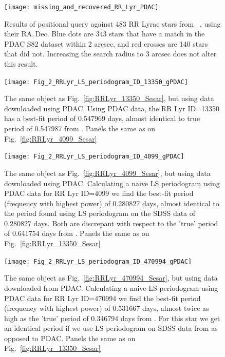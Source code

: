 \documentclass[fleqn,usenatbib]{mnras} %
\begin{document}
\begin{figure}
\texttt{[image: missing\_and\_recovered\_RR\_Lyr\_PDAC]}
\caption{Results of positional query against 483 RR Lyrae stars from ~\citep{sesar2010}, using their $\mathrm{RA}, \mathrm{Dec}$. Blue dots are 343 stars that have a match in the PDAC S82 dataset within 2 arcsec, and red crosses are 140 stars that did not. Increasing the search radius to 3 arcsec does not alter this result. }
\label{fig:PDAC_query_ra_dec}
\end{figure}


\begin{figure}
\texttt{[image: Fig\_2\_RRLyr\_LS\_periodogram\_ID\_13350\_gPDAC]}
\caption{ The same object as Fig.~\ref{fig:RRLyr_13350_Sesar}, but using data downloaded using PDAC. Using PDAC data, the RR Lyr ID=13350 has a best-fit period of 0.547969 days, almost identical to true period of  0.547987 from \citep{sesar2010}. Panels the same as on Fig.~\ref{fig:RRLyr_4099_Sesar}}
\label{fig:RRLyr_13350_PDAC}
\end{figure}

\begin{figure}
\texttt{[image: Fig\_2\_RRLyr\_LS\_periodogram\_ID\_4099\_gPDAC]}
\caption{ The same object as Fig.~\ref{fig:RRLyr_4099_Sesar}, but using data downloaded using PDAC. Calculating a naive LS periodogram using PDAC data for RR Lyr ID=4099 we find the  best-fit period (frequency with highest power) of 0.280827 days, almost identical to the period found using LS  periodogram on the SDSS \citep{sesar2010} data of 0.280827 days. Both are discrepant with respect to the 'true' period of 0.641754 days from \citep{sesar2010}. Panels the same as on Fig.~\ref{fig:RRLyr_13350_Sesar}}
\label{fig:RRLyr_4099_PDAC}
\end{figure}



\begin{figure}
\texttt{[image: Fig\_2\_RRLyr\_LS\_periodogram\_ID\_470994\_gPDAC]}
\caption{ The same object as Fig.~\ref{fig:RRLyr_470994_Sesar}, but using data downloaded from PDAC. Calculating a naive LS periodogram using PDAC data for RR Lyr ID=470994 we find the  best-fit period (frequency with highest power) of 0.531667  days, almost twice as high as the 'true'  period of 0.346794 days from  \citep{sesar2010}. For this star we get an identical period if we use LS periodogram on SDSS data from \citep{sesar2010} as opposed to PDAC. Panels the same as on Fig.~\ref{fig:RRLyr_13350_Sesar}}
\label{fig:RRLyr_470994_PDAC}
\end{figure}
\end{document}
